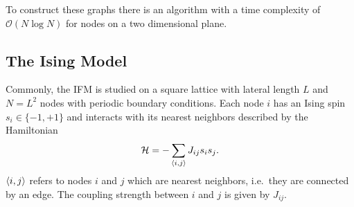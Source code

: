     To construct these graphs there is an algorithm\cite{RNGCell} with
    a time complexity of \(\mathcal{O}(N \log N)\) for nodes on a two
    dimensional plane.

\subsection{The Ising Model}
\label{ssec:model}
    Commonly, the IFM is studied on a square lattice with lateral length
    \(L\) and \(N=L^2\) nodes with periodic boundary conditions.
    Each node $i$ has an Ising spin \(s_i \in \{-1,+1\}\) and interacts with its
    nearest neighbors described by the Hamiltonian
    \begin{equation}
        \mathcal{H} = - \sum_{\left< i,j \right>}J_{ij}s_{i}s_{j}.
        \label{eq:hamiltonian}
    \end{equation}
    \(\left< i,j \right>\) refers to nodes \(i\) and \(j\) which are
    nearest neighbors, i.e.~they are connected by an edge.
    The coupling strength between \(i\) and \(j\) is given by
    \(J_{ij}\).

